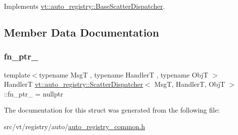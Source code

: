 Implements \hyperlink{structvt_1_1auto__registry_1_1_base_scatter_dispatcher_af9efaf266a3a809bfeaba5269f1583b2}{vt\+::auto\+\_\+registry\+::\+Base\+Scatter\+Dispatcher}.



\subsection{Member Data Documentation}
\mbox{\label{structvt_1_1auto__registry_1_1_scatter_dispatcher_af7ea94535c6ef560c3c0051275060d95}} 
\subsubsection{\texorpdfstring{fn\+\_\+ptr\+\_\+}{fn\_ptr\_}}
{\footnotesize\ttfamily template$<$typename MsgT , typename HandlerT , typename ObjT $>$ \\
HandlerT \hyperlink{structvt_1_1auto__registry_1_1_scatter_dispatcher}{vt\+::auto\+\_\+registry\+::\+Scatter\+Dispatcher}$<$ MsgT, HandlerT, ObjT $>$\+::fn\+\_\+ptr\+\_\+ = nullptr\hspace{0.3cm}{\ttfamily [private]}}



The documentation for this struct was generated from the following file\+:\begin{DoxyCompactItemize}
\item 
src/vt/registry/auto/\hyperlink{auto__registry__common_8h}{auto\+\_\+registry\+\_\+common.\+h}\end{DoxyCompactItemize}
